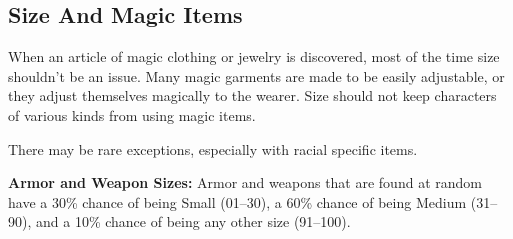 \subsection{Size And Magic Items}
When an article of magic clothing or jewelry is discovered, most of the time size shouldn't be an issue. Many magic garments are made to be easily adjustable, or they adjust themselves magically to the wearer. Size should not keep characters of various kinds from using magic items.

There may be rare exceptions, especially with racial specific items.

\textbf{Armor and Weapon Sizes:} Armor and weapons that are found at random have a 30\% chance of being Small (01--30), a 60\% chance of being Medium (31--90), and a 10\% chance of being any other size (91--100). 